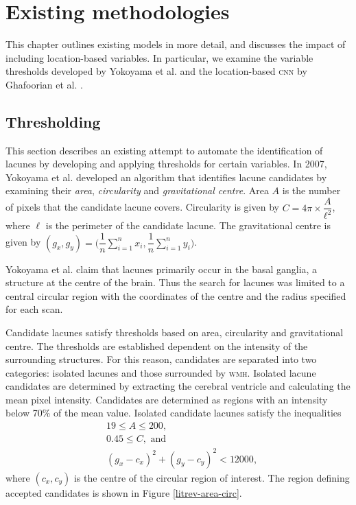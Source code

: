 


\chapter{Existing methodologies}\label{litrev}

This chapter outlines existing models in more detail, and discusses the impact of including location-based variables. In particular, we examine the variable thresholds developed by Yokoyama et al. \cite{Yokoyama2007} and the location-based \textsc{cnn} by Ghafoorian et al. \cite{GhafoorianM.2017Dml3}.

\section{Thresholding}\label{litrev-threshold}

This section describes an existing attempt to automate the identification of lacunes by developing and applying thresholds for certain variables. In 2007, Yokoyama et al. \cite{Yokoyama2007} developed an algorithm that identifies lacune candidates by examining their \textit{area}, \textit{circularity} and \textit{gravitational centre}. Area $A$ is the number of pixels that the candidate lacune covers. Circularity is given by $C = 4\pi\times\dfrac{A}{\ell^2}$, where $\ell$ is the perimeter of the candidate lacune. The gravitational centre is given by $(g_x, g_y) = \bigg(\dfrac{1}{n}\sum_{i=1}^nx_i, \dfrac{1}{n}\sum_{i=1}^ny_i\bigg)$.

Yokoyama et al. \cite{Yokoyama2007} claim that lacunes primarily occur in the basal ganglia, a structure at the centre of the brain. Thus the search for lacunes was limited to a central circular region with the coordinates of the centre and the radius specified for each scan.

Candidate lacunes satisfy thresholds based on area, circularity and gravitational centre. The thresholds are established dependent on the intensity of the surrounding structures. For this reason, candidates are separated into two categories: isolated lacunes and those surrounded by \textsc{wmh}. Isolated lacune candidates are determined by extracting the cerebral ventricle and calculating the mean pixel intensity. Candidates are determined as regions with an intensity below 70\% of the mean value. Isolated candidate lacunes satisfy the inequalities
\begin{align*}
	& 19 \le A \le 200, \\
	& 0.45 \le C,\text{ and } \\
	& (g_x - c_x)^2 + (g_y - c_y)^2 < 12000,
\end{align*}
where $(c_x, c_y)$ is the centre of the circular region of interest. The region defining accepted candidates is shown in Figure \ref{litrev-area-circ}.

